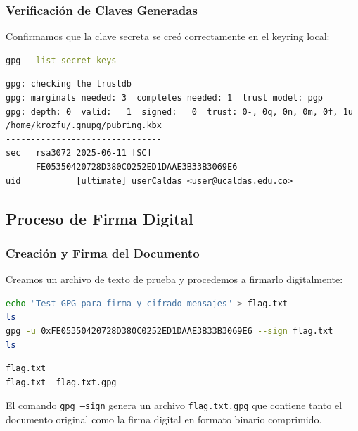\documentclass[12pt,a4paper]{article}
\begin{document}
\subsubsection{Verificación de Claves Generadas}

Confirmamos que la clave secreta se creó correctamente en el keyring local:

\begin{lstlisting}[language=bash, caption=Verificación de claves secretas en el keyring]
gpg --list-secret-keys
\end{lstlisting}

\begin{lstlisting}[language=text, caption=Salida de verificación de claves secretas]
gpg: checking the trustdb
gpg: marginals needed: 3  completes needed: 1  trust model: pgp
gpg: depth: 0  valid:   1  signed:   0  trust: 0-, 0q, 0n, 0m, 0f, 1u
/home/krozfu/.gnupg/pubring.kbx
-------------------------------
sec   rsa3072 2025-06-11 [SC]
      FE05350420728D380C0252ED1DAAE3B33B3069E6
uid           [ultimate] userCaldas <user@ucaldas.edu.co>
\end{lstlisting}

\subsection{Proceso de Firma Digital}

\subsubsection{Creación y Firma del Documento}

Creamos un archivo de texto de prueba y procedemos a firmarlo digitalmente:

\begin{lstlisting}[language=bash, caption=Creación del documento y proceso de firma]
echo "Test GPG para firma y cifrado mensajes" > flag.txt
ls
gpg -u 0xFE05350420728D380C0252ED1DAAE3B33B3069E6 --sign flag.txt
ls
\end{lstlisting}

\begin{lstlisting}[language=text, caption=Resultado del proceso de firma]
flag.txt
flag.txt  flag.txt.gpg
\end{lstlisting}

El comando \texttt{gpg --sign} genera un archivo \texttt{flag.txt.gpg} que
contiene tanto el documento original como la firma digital en formato binario
comprimido.
\end{document}
